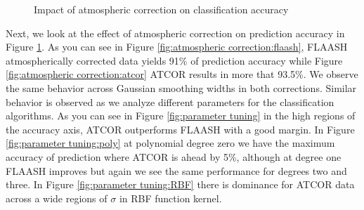 \documentclass[remotesensing,article,accept,moreauthors,pdftex,12pt,a4paper]{mdpi}
\begin{document}
\begin{figure}[t]
  \centering
  \hspace{1em}%
   \caption{Impact of atmospheric correction on classification accuracy}
 \label{fig:atmospheric correction}
\end{figure}

Next, we look at the effect of atmospheric correction on prediction accuracy in Figure \ref{fig:atmospheric correction}. 
As you can see in Figure \ref{fig:atmospheric correction:flaash}, FLAASH atmospherically corrected data yields 91\% of prediction accuracy while Figure \ref{fig:atmospheric correction:atcor} ATCOR results in more that 93.5\%. 
We observe the same behavior across Gaussian smoothing widths in both corrections. 
Similar behavior is observed as we analyze different parameters for the classification algorithms. 
As you can see in Figure \ref{fig:parameter tuning} in the high regions of the accuracy axis, ATCOR outperforms FLAASH with a good margin. 
In Figure \ref{fig:parameter tuning:poly} at polynomial degree zero we have the maximum accuracy of prediction where ATCOR is ahead by 5\%, although at degree one FLAASH improves but again we see the same performance for degrees two and three. 
In Figure \ref{fig:parameter tuning:RBF} there is dominance for ATCOR data across a wide regions of $\sigma$ in RBF function kernel.
\end{document}
